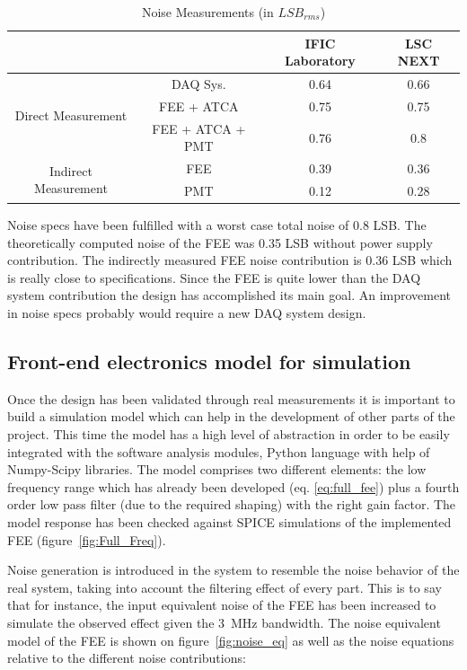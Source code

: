 \documentclass[a4paper, 10pt, oneside, twocolumn, 3p]{elsarticle}
\begin{document}
\begin{table}[ht]
	\caption{Noise Measurements (in $LSB_{rms}$)}
	\label{tab:noise}	
	\begin{center}
		\begin{tabular}{ c c || c | c |}
			& & IFIC Laboratory & LSC NEXT \\
			\hline
			\multirow{3}{*}{Direct Measurement} & DAQ Sys. & 0.64 & 0.66\\
			& FEE + ATCA & 0.75 & 0.75\\
			& FEE + ATCA + PMT & 0.76 & 0.8\\
			\hline
			\multirow{2}{*}{Indirect Measurement} & FEE & 0.39 & 0.36\\
			& PMT & 0.12 & 0.28\\
		\end{tabular}
	\end{center}
\end{table}


Noise specs have been fulfilled with a worst case total noise of 0.8 LSB. The theoretically computed noise of the FEE was 0.35 LSB without power supply contribution. The indirectly measured FEE noise contribution is 0.36 LSB which is really close to specifications. Since the FEE is quite lower than the DAQ system contribution the design has accomplished its main goal. An improvement in noise specs probably would require a new DAQ system design.

\subsection{Front-end electronics model for simulation}
Once the design has been validated through real measurements it is important to build a simulation model which can help in the development of other parts of the project. This time the model has a high level of abstraction in order to be easily integrated with the software analysis modules, Python language with help of Numpy-Scipy libraries. The model comprises two different elements: the low frequency range which has already been developed (eq. \ref{eq:full_fee}) plus a fourth order low pass filter (due to the required shaping) with the right gain factor. The model response has been checked against SPICE simulations of the implemented FEE (figure~\ref{fig:Full_Freq}).

\par Noise generation is introduced in the system to resemble the noise behavior of the real system, taking into account the filtering effect of every part. This is to say that for instance, the input equivalent noise of the FEE has been increased to simulate the observed effect given the 3~MHz bandwidth. The noise equivalent model of the FEE is shown on figure~\ref{fig:noise_eq} as well as the noise equations relative to the different noise contributions:
\end{document}

